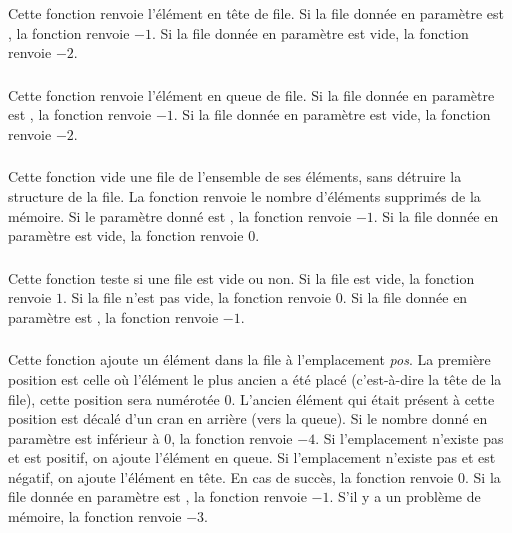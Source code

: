 \subsubsection*{}

\noindent Cette fonction renvoie l'élément en tête de file.
Si la file donnée en paramètre est , la fonction renvoie $ -1 $.
Si la file donnée en paramètre est vide, la fonction renvoie $ -2 $.


\subsubsection*{}

\noindent Cette fonction renvoie l'élément en queue de file.
Si la file donnée en paramètre est , la fonction renvoie $ -1 $.
Si la file donnée en paramètre est vide, la fonction renvoie $ -2 $.


\subsubsection*{}

\noindent Cette fonction vide une file de l'ensemble de ses éléments, sans détruire la structure de la file.
La fonction renvoie le nombre d'éléments supprimés de la mémoire.
Si le paramètre donné est , la fonction renvoie $ -1 $.
Si la file donnée en paramètre est vide, la fonction renvoie $ 0 $.


\subsubsection*{}

\noindent Cette fonction teste si une file est vide ou non.
Si la file est vide, la fonction renvoie $ 1 $.
Si la file n'est pas vide, la fonction renvoie $ 0 $.
Si la file donnée en paramètre est , la fonction renvoie $ -1 $.


\subsubsection*{}

\noindent Cette fonction ajoute un élément dans la file à l'emplacement \textit{pos}.
La première position est celle où l'élément le plus ancien a été placé (c'est-à-dire la tête de la file), cette position sera numérotée $ 0 $.
L'ancien élément qui était présent à cette position est décalé d'un cran en arrière (vers la queue).
Si le nombre donné en paramètre est inférieur à $ 0 $, la fonction renvoie $ -4 $.
Si l'emplacement n'existe pas et est positif, on ajoute l'élément en queue.
Si l'emplacement n'existe pas et est négatif, on ajoute l'élément en tête.
En cas de succès, la fonction renvoie $ 0 $.
Si la file donnée en paramètre est , la fonction renvoie $ -1 $.
S'il y a un problème de mémoire, la fonction renvoie $ -3 $.



